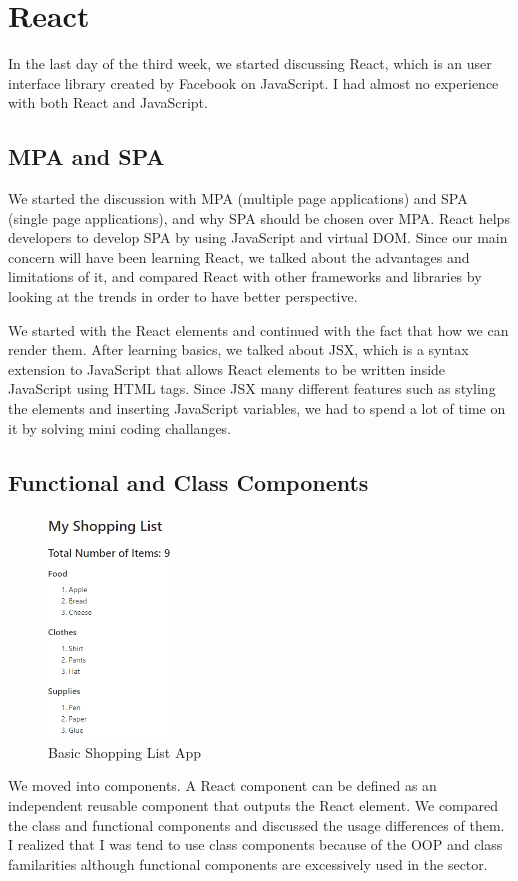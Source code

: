 \section{React}

In the last day of the third week, we started discussing React, which is an user interface library created by Facebook on JavaScript. I had almost no experience with both React and JavaScript. 

\subsection{MPA and SPA}

We started the discussion with MPA (multiple page applications) and SPA (single page applications), and why SPA should be chosen over MPA. React helps developers to develop SPA by using JavaScript and virtual DOM. Since our main concern will have been learning React, we talked about the advantages and limitations of it, and compared React with other frameworks and libraries by looking at the trends in order to have better perspective.

We started with the React elements and continued with the fact that how we can render them. After learning basics, we talked about JSX, which is a syntax extension to JavaScript that allows React elements to be written inside JavaScript using HTML tags. Since JSX many different features such as styling the elements and inserting JavaScript variables, we had to spend a lot of time on it by solving mini coding challanges.

\subsection{Functional and Class Components}

\begin{figure}
  \centering
  \includegraphics[width=0.3\textwidth]{img/shopping-app.png}
  \caption{Basic Shopping List App}
\end{figure}
We moved into components. A React component can be defined as an independent reusable component that outputs the React element. We compared the class and functional components and discussed the usage differences of them. I realized that I was tend to use class components because of the OOP and class familarities although functional components are excessively used in the sector.

